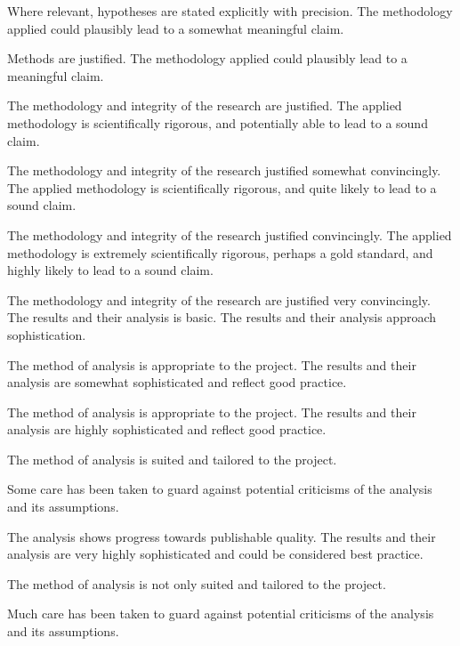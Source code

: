 \begin{markingrubric}
      \par		Where relevant, hypotheses are stated explicitly with precision.
        \grade\fail 
        \grade 		The methodology applied could plausibly lead to a somewhat meaningful claim.
        \par		Methods are justified.
        \grade 		The methodology applied could plausibly lead to a meaningful claim.
        \par		The methodology and integrity of the research are justified.
        \grade 		The applied methodology is scientifically rigorous, and potentially able to lead to a sound claim.
        \par		The methodology and integrity of the research justified somewhat convincingly.
        \grade 		The applied methodology is scientifically rigorous, and quite likely to lead to a sound claim.
        \par		The methodology and integrity of the research justified convincingly.
        \grade 		The applied methodology is extremely scientifically rigorous, perhaps a gold standard, and highly likely to lead to a sound claim.
        \par		The methodology and integrity of the research are justified very convincingly.
        \grade\fail 
        \grade 		The results and their analysis is basic.
        \grade 		The results and their analysis approach sophistication.
        \par 		The method of analysis is appropriate to the project.
        \grade 		The results and their analysis are somewhat sophisticated and reflect good practice.
        \par 		The method of analysis is appropriate to the project.
        \grade 		The results and their analysis are highly sophisticated and reflect good practice.
        \par 		The method of analysis is suited and tailored to the project.
       \par 		Some care has been taken to guard against potential criticisms of the analysis and its assumptions.
        \par		The analysis shows progress towards publishable quality.
        \grade 		The results and their analysis are very highly sophisticated and could be considered best practice.
        \par 		The method of analysis is not only suited and tailored to the project.
        \par 		Much care has been taken to guard against potential criticisms of the analysis and its assumptions.

\end{markingrubric}
